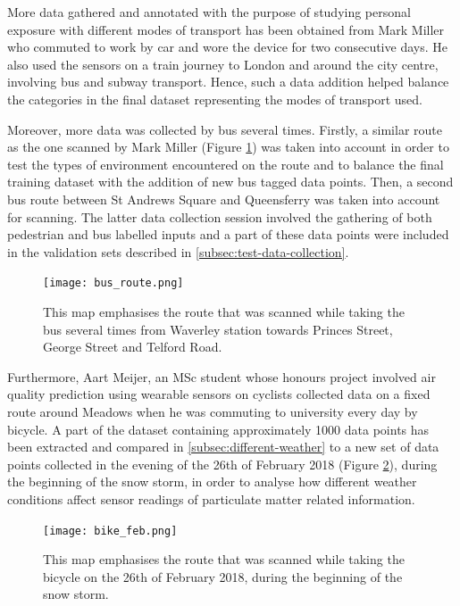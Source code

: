 \documentclass[bsc,frontabs,twoside,singlespacing, parskip,deptreport]{infthesis}     %
\begin{document}
More data gathered and annotated with the purpose of studying personal exposure with different modes of transport has been obtained from Mark Miller who commuted to work by car and wore the device for two consecutive days. He also used the sensors on a train journey to London and around the city centre, involving bus and subway transport. Hence, such a data addition helped balance the categories in the final dataset representing the modes of transport used.

Moreover, more data was collected by bus several times. Firstly, a similar route as the one scanned by Mark Miller (Figure \ref{fig:bus_route}) was taken into account in order to test the types of environment encountered on the route and to balance the final training dataset with the addition of new bus tagged data points. Then, a second bus route between St Andrews Square and Queensferry was taken into account for scanning. The latter data collection session involved the gathering of both pedestrian and bus labelled inputs and a part of these data points were included in the validation sets described in \ref{subsec:test-data-collection}.

\begin{figure}[h!]
  \center
  \texttt{[image: bus\_route.png]} 
  \caption{This map emphasises the route that was scanned while taking the bus several times from Waverley station towards Princes Street, George Street and Telford Road.}
  \label{fig:bus_route}
\end{figure}

Furthermore, Aart Meijer, an MSc student whose honours project involved air quality prediction using wearable sensors on cyclists collected data on a fixed route around Meadows when he was commuting to university every day by bicycle. A part of the dataset containing approximately 1000 data points has been extracted and compared in \ref{subsec:different-weather} to a new set of data points collected in the evening of the 26th of February 2018 (Figure \ref{fig:february-bike}), during the beginning of the snow storm, in order to analyse how different weather conditions affect sensor readings of particulate matter related information.

\begin{figure}[h!]
  \center
  \texttt{[image: bike\_feb.png]} 
  \caption{This map emphasises the route that was scanned while taking the bicycle on the 26th of February 2018, during the beginning of the snow storm.}
  \label{fig:february-bike}
\end{figure}
\end{document}
